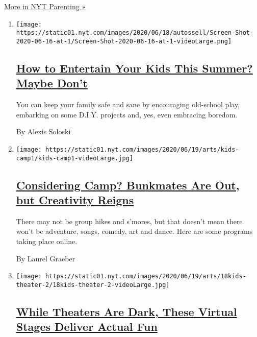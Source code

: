 \href{/spotlight/parenting}{More in NYT Parenting »}

\begin{enumerate}
\def\labelenumi{\arabic{enumi}.}
\item
  \texttt{[image: https://static01.nyt.com/images/2020/06/18/autossell/Screen-Shot-2020-06-16-at-1/Screen-Shot-2020-06-16-at-1-videoLarge.png]}

  \hypertarget{how-to-entertain-your-kids-this-summer-maybe-dont}{%
  \subsection{\texorpdfstring{\href{/2020/06/18/arts/kids-summer-activities-virus.html}{How
  to Entertain Your Kids This Summer? Maybe
  Don't}}{How to Entertain Your Kids This Summer? Maybe Don't}}\label{how-to-entertain-your-kids-this-summer-maybe-dont}}

  You can keep your family safe and sane by encouraging old-school play,
  embarking on some D.I.Y. projects and, yes, even embracing boredom.

  By Alexis Soloski
\item
  \texttt{[image: https://static01.nyt.com/images/2020/06/19/arts/kids-camp1/kids-camp1-videoLarge.jpg]}

  \hypertarget{considering-camp-bunkmates-are-out-but-creativity-reigns}{%
  \subsection{\texorpdfstring{\href{/2020/06/18/arts/kids-summer-camps-virtual.html}{Considering
  Camp? Bunkmates Are Out, but Creativity
  Reigns}}{Considering Camp? Bunkmates Are Out, but Creativity Reigns}}\label{considering-camp-bunkmates-are-out-but-creativity-reigns}}

  There may not be group hikes and s'mores, but that doesn't mean there
  won't be adventure, songs, comedy, art and dance. Here are some
  programs taking place online.

  By Laurel Graeber
\item
  \texttt{[image: https://static01.nyt.com/images/2020/06/19/arts/18kids-theater-2/18kids-theater-2-videoLarge.jpg]}

  \hypertarget{while-theaters-are-dark-these-virtual-stages-deliver-actual-fun}{%
  \subsection{\texorpdfstring{\href{/2020/06/18/theater/kids-summer-theater-virtual.html}{While
  Theaters Are Dark, These Virtual Stages Deliver Actual
  Fun}}{While Theaters Are Dark, These Virtual Stages Deliver Actual Fun}}\label{while-theaters-are-dark-these-virtual-stages-deliver-actual-fun}}


\end{enumerate}
